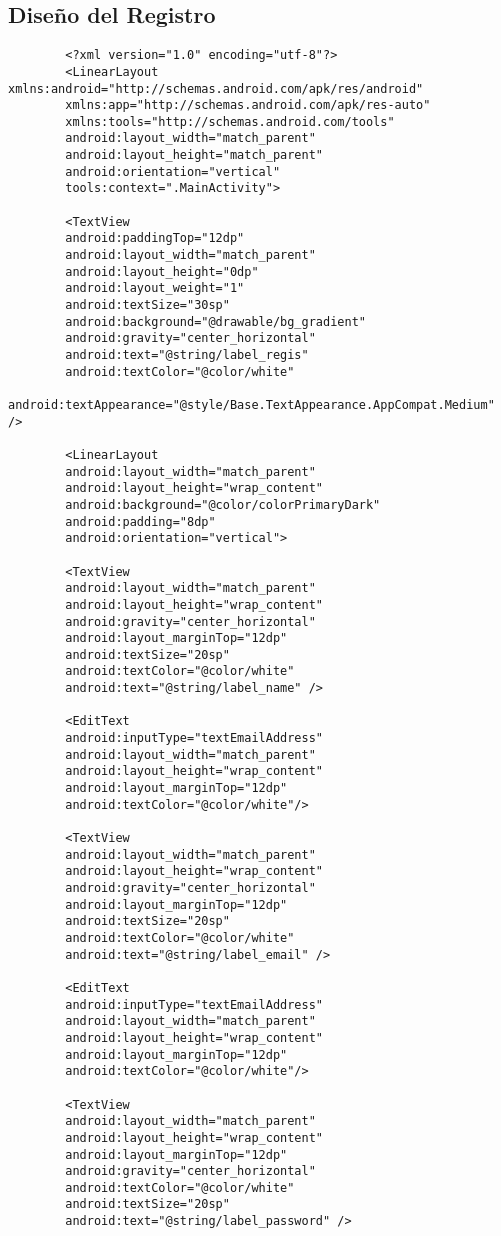 \documentclass[a4paper]{article}
\begin{document}
	
	
	\subsection{Diseño del Registro}
	
	\begin{lstlisting}
		<?xml version="1.0" encoding="utf-8"?>
		<LinearLayout xmlns:android="http://schemas.android.com/apk/res/android"
		xmlns:app="http://schemas.android.com/apk/res-auto"
		xmlns:tools="http://schemas.android.com/tools"
		android:layout_width="match_parent"
		android:layout_height="match_parent"
		android:orientation="vertical"
		tools:context=".MainActivity">
		
		<TextView
		android:paddingTop="12dp"
		android:layout_width="match_parent"
		android:layout_height="0dp"
		android:layout_weight="1"
		android:textSize="30sp"
		android:background="@drawable/bg_gradient"
		android:gravity="center_horizontal"
		android:text="@string/label_regis"
		android:textColor="@color/white"
		android:textAppearance="@style/Base.TextAppearance.AppCompat.Medium" />
		
		<LinearLayout
		android:layout_width="match_parent"
		android:layout_height="wrap_content"
		android:background="@color/colorPrimaryDark"
		android:padding="8dp"
		android:orientation="vertical">
		
		<TextView
		android:layout_width="match_parent"
		android:layout_height="wrap_content"
		android:gravity="center_horizontal"
		android:layout_marginTop="12dp"
		android:textSize="20sp"
		android:textColor="@color/white"
		android:text="@string/label_name" />
		
		<EditText
		android:inputType="textEmailAddress"
		android:layout_width="match_parent"
		android:layout_height="wrap_content"
		android:layout_marginTop="12dp"
		android:textColor="@color/white"/>
		
		<TextView
		android:layout_width="match_parent"
		android:layout_height="wrap_content"
		android:gravity="center_horizontal"
		android:layout_marginTop="12dp"
		android:textSize="20sp"
		android:textColor="@color/white"
		android:text="@string/label_email" />
		
		<EditText
		android:inputType="textEmailAddress"
		android:layout_width="match_parent"
		android:layout_height="wrap_content"
		android:layout_marginTop="12dp"
		android:textColor="@color/white"/>
		
		<TextView
		android:layout_width="match_parent"
		android:layout_height="wrap_content"
		android:layout_marginTop="12dp"
		android:gravity="center_horizontal"
		android:textColor="@color/white"
		android:textSize="20sp"
		android:text="@string/label_password" />
		

\end{lstlisting}
\end{document}
